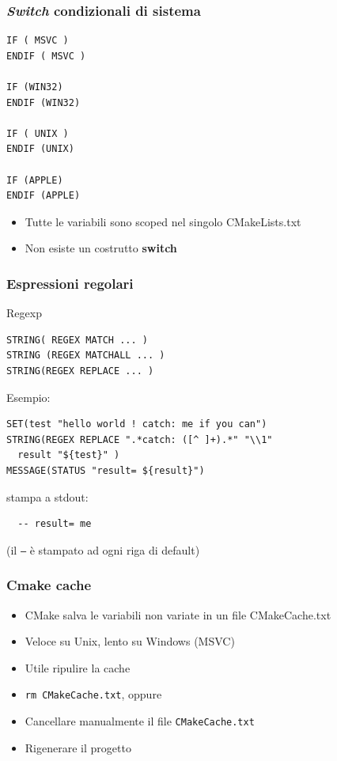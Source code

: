 \documentclass[10pt] {beamer}
\begin{document}

\begin{frame}[fragile]
\frametitle{\emph{Switch} condizionali di sistema}
\begin{verbatim}
IF ( MSVC )
ENDIF ( MSVC )

IF (WIN32)
ENDIF (WIN32)
 		
IF ( UNIX )
ENDIF (UNIX)
 		
IF (APPLE)
ENDIF (APPLE)
\end{verbatim}
\begin{itemize}
\item Tutte le variabili sono scoped nel singolo CMakeLists.txt
\item Non esiste un costrutto \textbf{switch}
\end{itemize}
\end{frame}


\begin{frame}[fragile]
\frametitle{ Espressioni regolari}

\begin{block}{Regexp}
\begin{verbatim}
STRING( REGEX MATCH ... )
STRING (REGEX MATCHALL ... )
STRING(REGEX REPLACE ... )
\end{verbatim}
\end{block}

Esempio:
\begin{verbatim}
SET(test "hello world ! catch: me if you can")
STRING(REGEX REPLACE ".*catch: ([^ ]+).*" "\\1" 
  result "${test}" )
MESSAGE(STATUS "result= ${result}")
\end{verbatim}
stampa a stdout:
\begin{verbatim}
  -- result= me
\end{verbatim}
(il \texttt{--} è stampato ad ogni riga di default)
\end{frame}



\begin{frame}
\frametitle{Cmake cache}
\begin{itemize}
\item CMake salva le variabili non variate in un file CMakeCache.txt
\item Veloce su Unix, lento su Windows (MSVC)
\item Utile ripulire la cache
\end{itemize}

\begin{itemize}
\item \texttt{rm CMakeCache.txt}, oppure
\item Cancellare manualmente il file \texttt{CMakeCache.txt}
\item Rigenerare il progetto
\end{itemize}

\end{frame}
\end{document}
